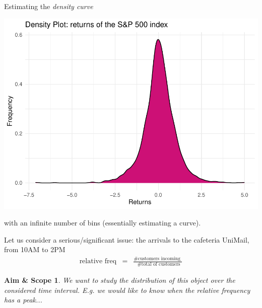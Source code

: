 \documentclass[notes=show,smaller,handout]{beamer}\usepackage[]{graphicx}\usepackage[]{color}
\newenvironment{knitrout}{}{} %
\newtheorem{aes}{Aim \& Scope}[section]
\begin{document}
\begin{frame}
  \begin{example}[continued]
  Estimating the \emph{density curve}
\begin{knitrout}
\color{fgcolor}

{\centering \includegraphics[width=0.5\linewidth]{figure/unnamed-chunk-6-1} 

}



\end{knitrout}
  with an infinite number of bins (essentially estimating a curve).
  \end{example}
\end{frame}

\begin{frame}{\secname}

\begin{example}[Cafeteria]
  Let us consider a serious/significant issue: the arrivals to the cafeteria
  UniMail, from 10AM to 2PM
  \begin{eqnarray*}
  \mbox{relative freq}&=& \frac{\mbox{\# customers incoming }}{\mbox{ \# total of customers}}
  \end{eqnarray*}

  \begin{aes}
  We want to study the distribution of this object over the considered time interval. E.g. we would like to know when the relative frequency has a peak...
  \end{aes}

  \end{example}
\end{frame}
\end{document}
